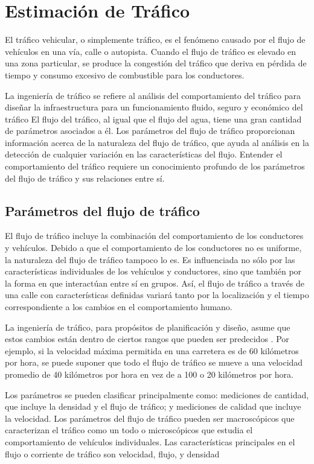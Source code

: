 \chapter{Estimación de Tráfico}
\label{cap:5}

El tráfico vehicular, o simplemente tráfico, es el fenómeno causado por el flujo de vehículos en una vía, calle o autopista. Cuando el flujo de tráfico es elevado en una zona particular, se produce la congestión del tráfico que deriva en pérdida de tiempo y consumo excesivo de combustible para los conductores.

La ingeniería de tráfico se refiere al análisis del comportamiento del tráfico para diseñar la infraestructura para un funcionamiento fluido, seguro y económico del tráfico \cite{kadiyali1987traffic} El flujo del tráfico, al igual que el flujo del agua, tiene una gran cantidad de parámetros asociados a él. Los parámetros del flujo de tráfico proporcionan información acerca de la naturaleza del flujo de tráfico, que ayuda al análisis en la detección de cualquier variación en las características del flujo. Entender el comportamiento del tráfico requiere un conocimiento profundo de los parámetros del flujo de tráfico y sus relaciones entre sí.

\section{Parámetros del flujo de tráfico}

El flujo de tráfico incluye la combinación del comportamiento de los conductores y vehículos. Debido a que el comportamiento de los conductores no es uniforme, la naturaleza del flujo de tráfico tampoco lo es. Es influenciada no sólo por las características individuales de los vehículos y conductores, sino que también por la forma en que interactúan entre sí en grupos. Así, el flujo de tráfico a través de una calle con características definidas variará tanto por la localización y el tiempo correspondiente a los cambios en el comportamiento humano.

La ingeniería de tráfico, para propósitos de planificación y diseño, asume que estos cambios están dentro de ciertos rangos que pueden ser predecidos \cite{papacostas1987fundamentals}. Por ejemplo, si la velocidad máxima permitida en una carretera es de 60 kilómetros por hora, se puede suponer que todo el flujo de tráfico se mueve a una velocidad promedio de 40 kilómetros por hora en vez de a 100 o 20 kilómetros por hora. 

Los parámetros se pueden clasificar principalmente como: mediciones de cantidad, que incluye la densidad y el flujo de tráfico; y mediciones de calidad que incluye la velocidad. Los parámetros del flujo de tráfico pueden ser macroscópicos que caracterizan el tráfico como un todo o microscópicos que estudia el comportamiento de vehículos individuales. Las características principales en el flujo o corriente de tráfico son velocidad, flujo, y densidad \cite{may1990fundamentals}


